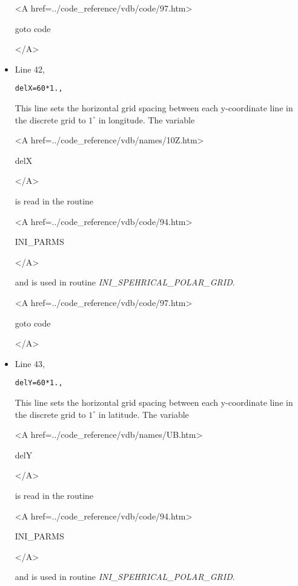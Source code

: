 \begin{itemize}
{\bf
\begin{rawhtml} <A href=../code_reference/vdb/code/97.htm> \end{rawhtml}
goto code
\begin{rawhtml} </A>\end{rawhtml}
}

\item Line 42,
\begin{verbatim}
delX=60*1.,
\end{verbatim}
This line sets the horizontal grid spacing between each y-coordinate line
in the discrete grid to $1^{\circ}$ in longitude.
The variable
{\bf
\begin{rawhtml} <A href=../code_reference/vdb/names/10Z.htm> \end{rawhtml}
delX
\begin{rawhtml} </A>\end{rawhtml}
}
is read in the routine
{\it
\begin{rawhtml} <A href=../code_reference/vdb/code/94.htm> \end{rawhtml}
INI\_PARMS
\begin{rawhtml} </A>\end{rawhtml}
} and is used in routine {\it INI\_SPEHRICAL\_POLAR\_GRID}. 

{\bf
\begin{rawhtml} <A href=../code_reference/vdb/code/97.htm> \end{rawhtml}
goto code
\begin{rawhtml} </A>\end{rawhtml}
}

\item Line 43,
\begin{verbatim}
delY=60*1.,
\end{verbatim}
This line sets the horizontal grid spacing between each y-coordinate line
in the discrete grid to $1^{\circ}$ in latitude.
The variable
{\bf
\begin{rawhtml} <A href=../code_reference/vdb/names/UB.htm> \end{rawhtml}
delY   
\begin{rawhtml} </A>\end{rawhtml}
}
is read in the routine
{\it
\begin{rawhtml} <A href=../code_reference/vdb/code/94.htm> \end{rawhtml}
INI\_PARMS
\begin{rawhtml} </A>\end{rawhtml}
} and is used in routine {\it INI\_SPEHRICAL\_POLAR\_GRID}. 


\end{itemize}
